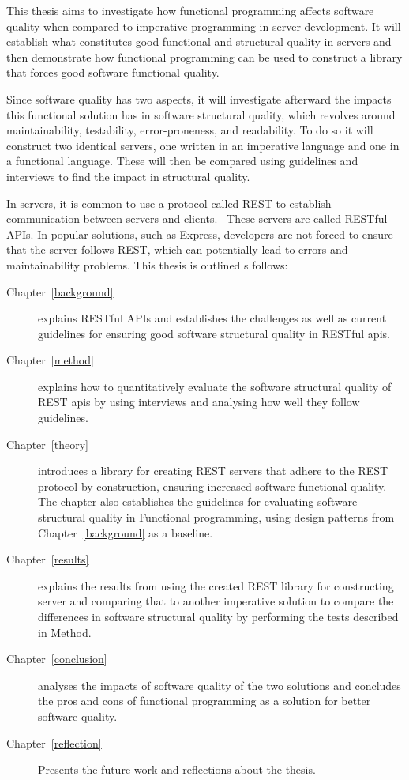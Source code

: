 This thesis aims to investigate how functional programming affects software
quality when compared to imperative programming in server development.  It will
establish what constitutes good functional and structural quality in servers and
then demonstrate how functional programming can be used to construct a library
that forces good software functional quality. 

Since software quality has two aspects, it will investigate afterward the
impacts this functional solution has in software structural quality, which
revolves around maintainability, testability, error-proneness, and readability.
To do so it will construct two identical servers, one written in an imperative
language and one in a functional language.  These will then be compared using
guidelines and interviews to find the impact in structural quality.

In servers, it is common to use a protocol called REST to establish
communication between servers and clients.~\cite{battle2008bridging} These
servers are called RESTful APIs. In popular solutions, such as Express,
developers are not forced to ensure that the server follows REST, which can
potentially lead to errors and maintainability problems. This thesis is outlined
s follows:

\begin{description}
    \item[Chapter~\ref{background}] explains RESTful APIs and establishes the
    challenges as well as current guidelines for ensuring good software
    structural quality in RESTful apis. 
    \item[Chapter~\ref{method}] explains how to quantitatively evaluate the
    software structural quality of REST apis by using interviews and analysing
    how well they follow guidelines. 
    \item[Chapter~\ref{theory}] introduces a library for creating REST servers
    that adhere to the REST protocol by construction, ensuring increased
    software functional quality. The chapter also establishes the guidelines for
    evaluating software structural quality in Functional programming, using
    design patterns from Chapter~\ref{background} as a baseline.   
    \item[Chapter~\ref{results}] explains the results from using the created
    REST library for constructing server and comparing that to another
    imperative solution to compare the differences in software structural
    quality by performing the tests described in Method.
    \item[Chapter~\ref{conclusion}] analyses the impacts of software quality of
    the two solutions and concludes the pros and cons of functional programming
    as a solution for better software quality.
    \item[Chapter~\ref{reflection}] Presents the future work and reflections
    about the thesis.
\end{description}

